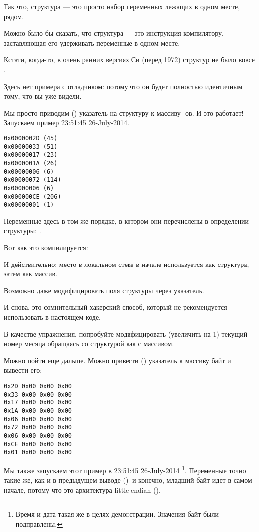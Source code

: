 Так что, структура --- это просто набор переменных лежащих в одном месте, рядом.

Можно было бы сказать, что структура --- это инструкция компилятору, заставляющая его удерживать переменные в одном месте.

Кстати, когда-то, в очень ранних версиях Си (перед 1972) структур не было вовсе \RitchieDevC.

Здесь нет примера с отладчиком: потому что он будет полностью идентичным тому, что вы уже видели.




Мы просто приводим () указатель на структуру к массиву \Tint{}-ов.
И это работает!
Запускаем пример 23:51:45 26-July-2014.

\begin{lstlisting}[label=GCC_tm3_output]
0x0000002D (45)
0x00000033 (51)
0x00000017 (23)
0x0000001A (26)
0x00000006 (6)
0x00000072 (114)
0x00000006 (6)
0x000000CE (206)
0x00000001 (1)
\end{lstlisting}

Переменные здесь в том же порядке, в котором они перечислены в определении структуры: .

Вот как это компилируется:



И действительно: место в локальном стеке в начале используется как структура, затем как массив.

Возможно даже модифицировать поля структуры через указатель.

И снова, это сомнительный хакерский способ, который не рекомендуется использовать в настоящем коде.

\myparagraphold{\Exercise}

В качестве упражнения, попробуйте модифицировать (увеличить на 1) 
текущий номер месяца обращаясь со структурой как с массивом.


Можно пойти еще дальше. Можно привести () указатель к массиву байт и вывести его:%



\begin{lstlisting}
0x2D 0x00 0x00 0x00 
0x33 0x00 0x00 0x00 
0x17 0x00 0x00 0x00 
0x1A 0x00 0x00 0x00 
0x06 0x00 0x00 0x00 
0x72 0x00 0x00 0x00 
0x06 0x00 0x00 0x00 
0xCE 0x00 0x00 0x00 
0x01 0x00 0x00 0x00 
\end{lstlisting}

Мы также запускаем этот пример в 23:51:45 26-July-2014
\footnote{Время и дата такая же в целях демонстрации. Значения байт были подправлены.}.
Переменные точно такие же, как и в предыдущем выводе 
(), и конечно, младший байт идет в самом начале, потому что это архитектура 
little-endian ().


